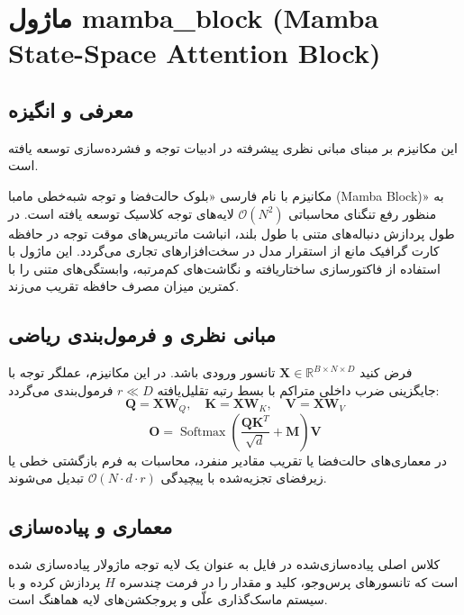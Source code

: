 \section{ماژول mamba\_block (Mamba State-Space Attention Block)}
\label{sec:module_mamba_block}

\subsection{معرفی و انگیزه}
این مکانیزم بر مبنای مبانی نظری پیشرفته در ادبیات توجه و فشرده‌سازی \cite{gu2023mamba} توسعه یافته است.

مکانیزم  با نام فارسی «بلوک حالت‌فضا و توجه شبه‌خطی مامبا (Mamba Block)» به منظور رفع تنگنای محاسباتی $\mathcal{O}(N^2)$ لایه‌های توجه کلاسیک توسعه یافته است. در طول پردازش دنباله‌های متنی با طول بلند، انباشت ماتریس‌های موقت توجه در حافظه کارت گرافیک مانع از استقرار مدل در سخت‌افزارهای تجاری می‌گردد. این ماژول با استفاده از فاکتورسازی ساختاریافته و نگاشت‌های کم‌مرتبه، وابستگی‌های متنی را با کمترین میزان مصرف حافظه تقریب می‌زند.

\subsection{مبانی نظری و فرمول‌بندی ریاضی}
فرض کنید $\mathbf{X} \in \mathbb{R}^{B \times N \times D}$ تانسور ورودی باشد. در این مکانیزم، عملگر توجه با جایگزینی ضرب داخلی متراکم با بسط رتبه تقلیل‌یافته $r \ll D$ فرمول‌بندی می‌گردد:
 \begin{equation}
\mathbf{Q} = \mathbf{X} \mathbf{W}_Q, \quad \mathbf{K} = \mathbf{X} \mathbf{W}_K, \quad \mathbf{V} = \mathbf{X} \mathbf{W}_V
\end{equation}
 \begin{equation}
\mathbf{O} = \operatorname{Softmax}\left(\frac{\mathbf{Q} \mathbf{K}^T}{\sqrt{d}} + \mathbf{M}
\right) \mathbf{V}
\end{equation}
در معماری‌های حالت‌فضا یا تقریب مقادیر منفرد، محاسبات به فرم بازگشتی خطی یا زیرفضای تجزیه‌شده با پیچیدگی $\mathcal{O}(N \cdot d \cdot r)$ تبدیل می‌شوند.

\subsection{معماری و پیاده‌سازی}
کلاس اصلی پیاده‌سازی‌شده در فایل  به عنوان یک لایه توجه ماژولار پیاده‌سازی شده است که تانسورهای پرس‌وجو، کلید و مقدار را در فرمت چندسره $H$ پردازش کرده و با سیستم ماسک‌گذاری علّی و پروجکشن‌های لایه هماهنگ است.

